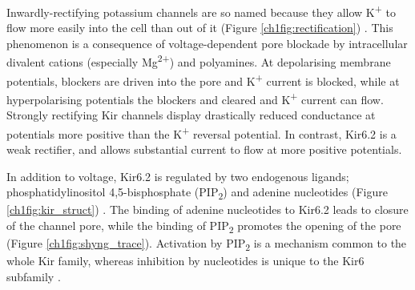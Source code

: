 Inwardly-rectifying potassium channels are so named because they allow K\textsuperscript{+} to flow more easily into the cell than out of it (Figure \ref{ch1fig:rectification}) \cite{hille_ion_2001, zheng_handbook_2015}.
This phenomenon is a consequence of voltage-dependent pore blockade by intracellular divalent cations (especially Mg\textsuperscript{2+}) and polyamines.
At depolarising membrane potentials, blockers are driven into the pore and K\textsuperscript{+} current is blocked, while at hyperpolarising potentials the blockers and cleared and K\textsuperscript{+} current can flow.
Strongly rectifying Kir channels display drastically reduced conductance at potentials more positive than the K\textsuperscript{+} reversal potential.
In contrast, Kir6.2 is a weak rectifier, and allows substantial current to flow at more positive potentials.

In addition to voltage, Kir6.2 is regulated by two endogenous ligands; 
phosphatidylinositol 4,5-bisphosphate (PIP\textsubscript{2}) and adenine nucleotides (Figure \ref{ch1fig:kir_struct}) \cite{baukrowitz_pip2_1998, shyng_membrane_1998}.
The binding of adenine nucleotides to Kir6.2 leads to closure of the channel pore, while the binding of PIP\textsubscript{2} promotes the opening of the pore (Figure \ref{ch1fig:shyng_trace}).
Activation by PIP\textsubscript{2} is a mechanism common to the whole Kir family, whereas inhibition by nucleotides is unique to the Kir6 subfamily \cite{enkvetchakul_direct_2005}.

